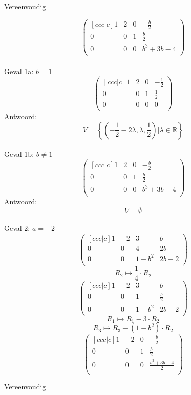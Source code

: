 \documentclass[lineaire_algebra_oplossingen.tex]{subfiles}
\begin{document}
\begin{center}
Vereenvoudig
\end{center}
\[
\begin{pmatrix}[ccc|c]
1 & 2 & 0 & -\frac{b}{2}\\
0 & 0 & 1 & \frac{b}{2}\\
0 & 0 & 0 & b^{3}+3b-4\\
\end{pmatrix}
\]
\\Geval 1a: $b=1$
\[
\begin{pmatrix}[ccc|c]
1 & 2 & 0 & -\frac{1}{2}\\
0 & 0 & 1 & \frac{1}{2}\\
0 & 0 & 0 & 0\\
\end{pmatrix}
\]
Antwoord:
\[
V = \left\lbrace \left(-\frac{1}{2}-2\lambda,\lambda,\frac{1}{2}\right)| \lambda \in \mathbb{R}\right\rbrace
\]
\\Geval 1b: $b\neq 1$
\[
\begin{pmatrix}[ccc|c]
1 & 2 & 0 & -\frac{b}{2}\\
0 & 0 & 1 & \frac{b}{2}\\
0 & 0 & 0 & b^{3}+3b-4\\
\end{pmatrix}
\]
Antwoord:
\[
V = \emptyset
\]
\\Geval 2: $a=-2$
\[
\begin{pmatrix}[ccc|c]
1 & -2 & 3 & b\\
0 & 0 & 4 & 2b\\
0 & 0 & 1-b^{2} & 2b-2\\
\end{pmatrix}
\]
\[ R_2 \longmapsto \frac{1}{4}\cdot R_2 \]
\[
\begin{pmatrix}[ccc|c]
1 & -2 & 3 & b\\
0 & 0 & 1 & \frac{b}{2}\\
0 & 0 & 1-b^{2} & 2b-2\\
\end{pmatrix}
\]
\[ R_1 \longmapsto R_1 - 3\cdot R_2 \]
\[ R_3 \longmapsto R_3 - (1-b^{2})\cdot R_2 \]
\[
\begin{pmatrix}[ccc|c]
1 & -2 & 0 & -\frac{b}{2}\\
0 & 0 & 1 & \frac{b}{2}\\
0 & 0 & 0 & \frac{b^3+3b-4}{2}\\
\end{pmatrix}
\]
\begin{center}
Vereenvoudig
\end{center}
\end{document}
